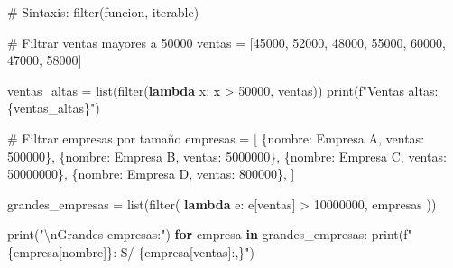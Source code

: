 \documentclass[
  doc,
  floatsintext,
  longtable,
  a4paper,
  nolmodern,
  notxfonts,
  notimes,
  12pt,
  colorlinks=true,linkcolor=blue,citecolor=blue,urlcolor=blue]{apa7}
\newenvironment{Shaded}{\begin{snugshade}}{\end{snugshade}}
\newcommand{\BuiltInTok}[1]{\textcolor[rgb]{0.00,0.23,0.31}{#1}}
\newcommand{\CharTok}[1]{\textcolor[rgb]{0.13,0.47,0.30}{#1}}
\newcommand{\CommentTok}[1]{\textcolor[rgb]{0.37,0.37,0.37}{#1}}
\newcommand{\ControlFlowTok}[1]{\textcolor[rgb]{0.00,0.23,0.31}{\textbf{#1}}}
\newcommand{\DecValTok}[1]{\textcolor[rgb]{0.68,0.00,0.00}{#1}}
\newcommand{\KeywordTok}[1]{\textcolor[rgb]{0.00,0.23,0.31}{\textbf{#1}}}
\newcommand{\NormalTok}[1]{\textcolor[rgb]{0.00,0.23,0.31}{#1}}
\newcommand{\OperatorTok}[1]{\textcolor[rgb]{0.37,0.37,0.37}{#1}}
\newcommand{\SpecialCharTok}[1]{\textcolor[rgb]{0.37,0.37,0.37}{#1}}
\newcommand{\SpecialStringTok}[1]{\textcolor[rgb]{0.13,0.47,0.30}{#1}}
\newcommand{\StringTok}[1]{\textcolor[rgb]{0.13,0.47,0.30}{#1}}
\begin{document}
\begin{Shaded}
\begin{Highlighting}[]
\CommentTok{\# Sintaxis: filter(funcion, iterable)}

\CommentTok{\# Filtrar ventas mayores a 50000}
\NormalTok{ventas }\OperatorTok{=}\NormalTok{ [}\DecValTok{45000}\NormalTok{, }\DecValTok{52000}\NormalTok{, }\DecValTok{48000}\NormalTok{, }\DecValTok{55000}\NormalTok{, }\DecValTok{60000}\NormalTok{, }\DecValTok{47000}\NormalTok{, }\DecValTok{58000}\NormalTok{]}

\NormalTok{ventas\_altas }\OperatorTok{=} \BuiltInTok{list}\NormalTok{(}\BuiltInTok{filter}\NormalTok{(}\KeywordTok{lambda}\NormalTok{ x: x }\OperatorTok{\textgreater{}} \DecValTok{50000}\NormalTok{, ventas))}
\BuiltInTok{print}\NormalTok{(}\SpecialStringTok{f"Ventas altas: }\SpecialCharTok{\{}\NormalTok{ventas\_altas}\SpecialCharTok{\}}\SpecialStringTok{"}\NormalTok{)}

\CommentTok{\# Filtrar empresas por tamaño}
\NormalTok{empresas }\OperatorTok{=}\NormalTok{ [}
\NormalTok{    \{}\StringTok{\textquotesingle{}nombre\textquotesingle{}}\NormalTok{: }\StringTok{\textquotesingle{}Empresa A\textquotesingle{}}\NormalTok{, }\StringTok{\textquotesingle{}ventas\textquotesingle{}}\NormalTok{: }\DecValTok{500000}\NormalTok{\},}
\NormalTok{    \{}\StringTok{\textquotesingle{}nombre\textquotesingle{}}\NormalTok{: }\StringTok{\textquotesingle{}Empresa B\textquotesingle{}}\NormalTok{, }\StringTok{\textquotesingle{}ventas\textquotesingle{}}\NormalTok{: }\DecValTok{5000000}\NormalTok{\},}
\NormalTok{    \{}\StringTok{\textquotesingle{}nombre\textquotesingle{}}\NormalTok{: }\StringTok{\textquotesingle{}Empresa C\textquotesingle{}}\NormalTok{, }\StringTok{\textquotesingle{}ventas\textquotesingle{}}\NormalTok{: }\DecValTok{50000000}\NormalTok{\},}
\NormalTok{    \{}\StringTok{\textquotesingle{}nombre\textquotesingle{}}\NormalTok{: }\StringTok{\textquotesingle{}Empresa D\textquotesingle{}}\NormalTok{, }\StringTok{\textquotesingle{}ventas\textquotesingle{}}\NormalTok{: }\DecValTok{800000}\NormalTok{\},}
\NormalTok{]}

\NormalTok{grandes\_empresas }\OperatorTok{=} \BuiltInTok{list}\NormalTok{(}\BuiltInTok{filter}\NormalTok{(}
    \KeywordTok{lambda}\NormalTok{ e: e[}\StringTok{\textquotesingle{}ventas\textquotesingle{}}\NormalTok{] }\OperatorTok{\textgreater{}} \DecValTok{10000000}\NormalTok{,}
\NormalTok{    empresas}
\NormalTok{))}

\BuiltInTok{print}\NormalTok{(}\StringTok{"}\CharTok{\textbackslash{}n}\StringTok{Grandes empresas:"}\NormalTok{)}
\ControlFlowTok{for}\NormalTok{ empresa }\KeywordTok{in}\NormalTok{ grandes\_empresas:}
    \BuiltInTok{print}\NormalTok{(}\SpecialStringTok{f"  }\SpecialCharTok{\{}\NormalTok{empresa[}\StringTok{\textquotesingle{}nombre\textquotesingle{}}\NormalTok{]}\SpecialCharTok{\}}\SpecialStringTok{: S/ }\SpecialCharTok{\{}\NormalTok{empresa[}\StringTok{\textquotesingle{}ventas\textquotesingle{}}\NormalTok{]}\SpecialCharTok{:,\}}\SpecialStringTok{"}\NormalTok{)}


\end{Highlighting}
\end{Shaded}
\end{document}
